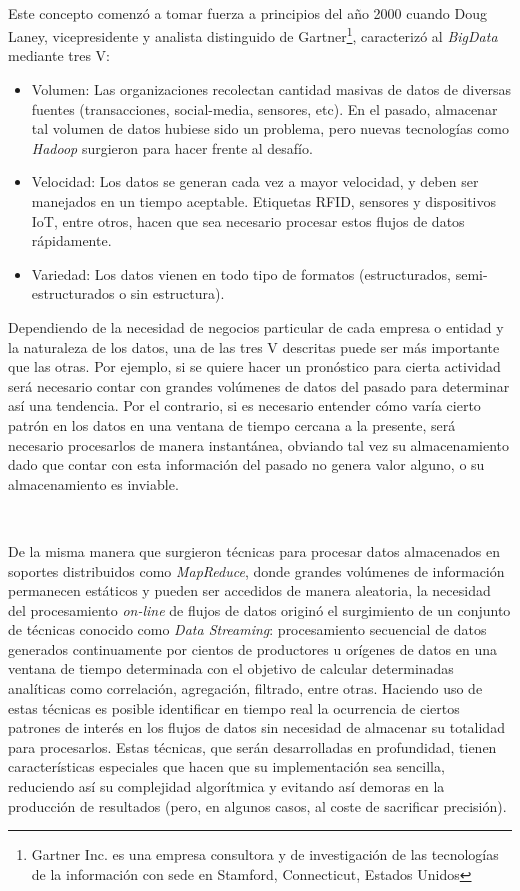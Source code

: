 \documentclass[a4paper,12pt, oneside]{article}
\begin{document}
\

Este concepto comenzó a tomar fuerza a principios del año 2000 cuando Doug Laney, vicepresidente y analista distinguido de Gartner\footnote{Gartner Inc. es una empresa consultora y de investigación de las tecnologías de la información con sede en Stamford, Connecticut, Estados Unidos}, caracterizó al \textit{BigData} mediante tres V:
\begin{itemize}
	\item Volumen: Las organizaciones recolectan cantidad masivas de datos de diversas fuentes (transacciones, social-media, sensores, etc). En el pasado, almacenar tal volumen de datos hubiese sido un problema, pero nuevas tecnologías como \textit{Hadoop} surgieron para hacer frente al desafío.
	\item Velocidad: Los datos se generan cada vez a mayor velocidad, y deben ser manejados en un tiempo aceptable. Etiquetas RFID, sensores y dispositivos IoT, entre otros, hacen que sea necesario procesar estos flujos de datos rápidamente.
	\item Variedad: Los datos vienen en todo tipo de formatos (estructurados, semi-estructurados o sin estructura).
\end{itemize}

Dependiendo de la necesidad de negocios particular de cada empresa o entidad y la naturaleza de los datos, una de las tres V descritas puede ser más importante que las otras. Por ejemplo, si se quiere hacer un pronóstico para cierta actividad será necesario contar con grandes volúmenes de datos del pasado para determinar así una tendencia. Por el contrario, si es necesario entender cómo varía cierto patrón en los datos en una ventana de tiempo cercana a la presente, será necesario procesarlos de manera instantánea, obviando tal vez su almacenamiento dado que contar con esta información del pasado no genera valor alguno, o su almacenamiento es inviable.

\

De la misma manera que surgieron técnicas para procesar datos almacenados en soportes distribuidos como \textit{MapReduce}\cite{Dean:2004:MSD:1251254.1251264}, donde grandes volúmenes de información permanecen estáticos y pueden ser accedidos de manera aleatoria, la necesidad del procesamiento \textit{on-line} de flujos de datos originó el surgimiento de un conjunto de técnicas conocido como \textit{Data Streaming}: procesamiento secuencial de datos generados continuamente por cientos de productores u orígenes de datos en una ventana de tiempo determinada con el objetivo de calcular determinadas analíticas como correlación, agregación, filtrado, entre otras. Haciendo uso de estas técnicas es posible identificar en tiempo real la ocurrencia de ciertos patrones de interés en los flujos de datos sin necesidad de almacenar su totalidad para procesarlos. Estas técnicas, que serán desarrolladas en profundidad, tienen características especiales que hacen que su implementación sea sencilla, reduciendo así su complejidad algorítmica y evitando así demoras en la producción de resultados (pero, en algunos casos, al coste de sacrificar precisión).
\end{document}
